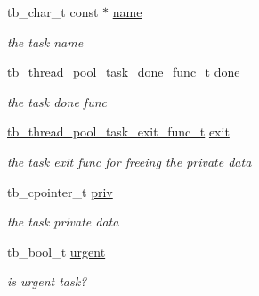 \begin{DoxyCompactItemize}
\item 
\hypertarget{structtb__thread__pool__task__t_a73b91978cf70c01e5d9e8ceb2cb0b857}{tb\-\_\-char\-\_\-t const $\ast$ \hyperlink{structtb__thread__pool__task__t_a73b91978cf70c01e5d9e8ceb2cb0b857}{name}}\label{structtb__thread__pool__task__t_a73b91978cf70c01e5d9e8ceb2cb0b857}

\begin{DoxyCompactList}\small\item\em the task name \end{DoxyCompactList}\item 
\hypertarget{structtb__thread__pool__task__t_a1bba31b39ba3a9d58346ebf54e279ca1}{\hyperlink{thread__pool_8h_ab14e7bd7c70fed7b9a7793a635108840}{tb\-\_\-thread\-\_\-pool\-\_\-task\-\_\-done\-\_\-func\-\_\-t} \hyperlink{structtb__thread__pool__task__t_a1bba31b39ba3a9d58346ebf54e279ca1}{done}}\label{structtb__thread__pool__task__t_a1bba31b39ba3a9d58346ebf54e279ca1}

\begin{DoxyCompactList}\small\item\em the task done func \end{DoxyCompactList}\item 
\hypertarget{structtb__thread__pool__task__t_a0ea5665d778905114a505e1d84fd600f}{\hyperlink{thread__pool_8h_a3f10ee86a753f7233d3258221b144fd1}{tb\-\_\-thread\-\_\-pool\-\_\-task\-\_\-exit\-\_\-func\-\_\-t} \hyperlink{structtb__thread__pool__task__t_a0ea5665d778905114a505e1d84fd600f}{exit}}\label{structtb__thread__pool__task__t_a0ea5665d778905114a505e1d84fd600f}

\begin{DoxyCompactList}\small\item\em the task exit func for freeing the private data \end{DoxyCompactList}\item 
\hypertarget{structtb__thread__pool__task__t_ab910a84564ca8acb442baa58756c37ca}{tb\-\_\-cpointer\-\_\-t \hyperlink{structtb__thread__pool__task__t_ab910a84564ca8acb442baa58756c37ca}{priv}}\label{structtb__thread__pool__task__t_ab910a84564ca8acb442baa58756c37ca}

\begin{DoxyCompactList}\small\item\em the task private data \end{DoxyCompactList}\item 
\hypertarget{structtb__thread__pool__task__t_a754ed844c2aa386b0ca142a51ec546da}{tb\-\_\-bool\-\_\-t \hyperlink{structtb__thread__pool__task__t_a754ed844c2aa386b0ca142a51ec546da}{urgent}}\label{structtb__thread__pool__task__t_a754ed844c2aa386b0ca142a51ec546da}

\begin{DoxyCompactList}\small\item\em is urgent task? \end{DoxyCompactList}\end{DoxyCompactItemize}


